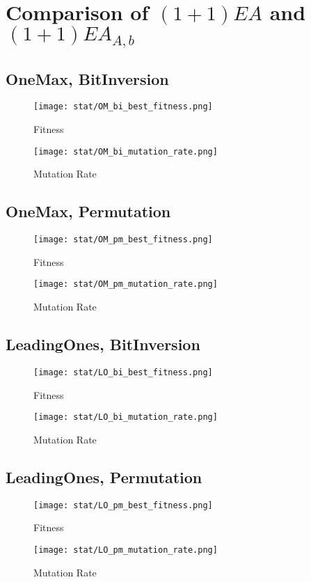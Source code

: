 \documentclass{article}
\begin{document}
\section{Comparison of $(1+1)EA$ and $(1+1)EA_{A,b}$}

\subsection{OneMax, BitInversion}

\begin{figure}[H]
  \texttt{[image: stat/OM\_bi\_best\_fitness.png]}
  \caption{Fitness}
\end{figure}
\begin{figure}[H]
  \texttt{[image: stat/OM\_bi\_mutation\_rate.png]}
  \caption{Mutation Rate}
\end{figure}

\subsection{OneMax, Permutation}

\begin{figure}[H]
  \texttt{[image: stat/OM\_pm\_best\_fitness.png]}
  \caption{Fitness}
\end{figure}
\begin{figure}[H]
  \texttt{[image: stat/OM\_pm\_mutation\_rate.png]}
  \caption{Mutation Rate}
\end{figure}

\subsection{LeadingOnes, BitInversion}

\begin{figure}[H]
  \texttt{[image: stat/LO\_bi\_best\_fitness.png]}
  \caption{Fitness}
\end{figure}
\begin{figure}[H]
  \texttt{[image: stat/LO\_bi\_mutation\_rate.png]}
  \caption{Mutation Rate}
\end{figure}

\subsection{LeadingOnes, Permutation}

\begin{figure}[H]
  \texttt{[image: stat/LO\_pm\_best\_fitness.png]}
  \caption{Fitness}
\end{figure}
\begin{figure}[H]
  \texttt{[image: stat/LO\_pm\_mutation\_rate.png]}
  \caption{Mutation Rate}
\end{figure}
\end{document}
